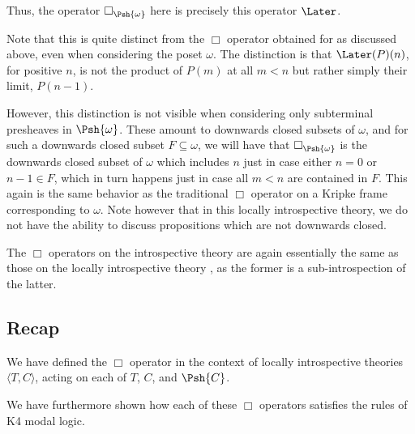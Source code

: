 Thus, the operator $\Box_{\Psh{\omega}}$ here is precisely this operator $\Later$.

Note that this is quite distinct from the $\Box$ operator obtained for  as discussed above, even when considering the poset $\omega$. The distinction is that $\Later(P)(n)$, for positive $n$, is not the product of $P(m)$ at all $m < n$ but rather simply their limit, $P(n - 1)$.

However, this distinction is not visible when considering only subterminal presheaves in $\Psh{\omega}$. These amount to downwards closed subsets of $\omega$, and for such a downwards closed subset $F \subseteq \omega$, we will have that $\Box_{\Psh{\omega}}$ is the downwards closed subset of $\omega$ which includes $n$ just in case either $n = 0$ or $n - 1 \in F$, which in turn happens just in case all $m < n$ are contained in $F$. This again is the same behavior as the traditional $\Box$ operator on a Kripke frame corresponding to $\omega$. Note however that in this locally introspective theory, we do not have the ability to discuss propositions which are not downwards closed.

The $\Box$ operators on the introspective theory  are again essentially the same as those on the locally introspective theory , as the former is a sub-introspection of the latter.


\subsection{Recap}
We have defined the $\Box$ operator in the context of locally introspective theories $\langle T, C \rangle$, acting on each of $T$, $C$, and $\Psh{C}$.

We have furthermore shown how each of these $\Box$ operators satisfies the rules of K4 modal logic.

